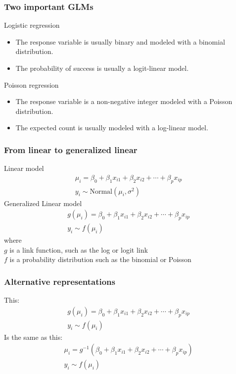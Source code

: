 \documentclass[color=usenames,dvipsnames]{beamer}\usepackage[]{graphicx}\usepackage[]{xcolor}
\begin{document}
\begin{frame}
  \frametitle{Two important GLMs}
  {Logistic regression \\}
  \begin{itemize}
    \item The response variable is usually binary and modeled with a
      binomial distribution.
    \item The probability of success is usually a logit-linear
      model.
  \end{itemize}
  \pause
  \vfill
  {Poisson regression \\}
  \begin{itemize}
    \item The response variable is a non-negative integer modeled with
      a Poisson distribution.
    \item The expected count is usually modeled with a log-linear
      model.
  \end{itemize}
  \vfill
\end{frame}



\begin{frame}
  \frametitle{From linear to generalized linear}
  {Linear model}
  \begin{gather*}
    \mu_i = \beta_0 + \beta_1 x_{i1} + \beta_2 x_{i2} + \cdots + \beta_p x_{ip} \\
    y_i \sim \mathrm{Normal}(\mu_i, \sigma^2)
  \end{gather*}
  \pause
  \vfill
  {Generalized Linear model}
  \begin{gather*}
    g(\mu_i) = \beta_0 + \beta_1 x_{i1} + \beta_2 x_{i2} + \cdots + \beta_p x_{ip} \\
    y_i \sim f(\mu_i)
  \end{gather*}
  \pause
  {where} \\
  $g$ is a link function, such as the log or logit link \\
  \pause
  $f$ is a probability distribution such as the binomial or Poisson
\end{frame}


\begin{frame}
  \frametitle{Alternative representations}
  {This:}
  \begin{gather*}
    g(\mu_i) = \beta_0 + \beta_1 x_{i1} + \beta_2 x_{i2} + \cdots + \beta_p x_{ip} \\
    y_i \sim f(\mu_i)
  \end{gather*}
  \pause
  {Is the same as this:}
  \begin{gather*}
    \mu_i = g^{-1}(\beta_0 + \beta_1 x_{i1} + \beta_2 x_{i2} + \cdots + \beta_p x_{ip}) \\
    y_i \sim f(\mu_i)
  \end{gather*}
\end{frame}
\end{document}
